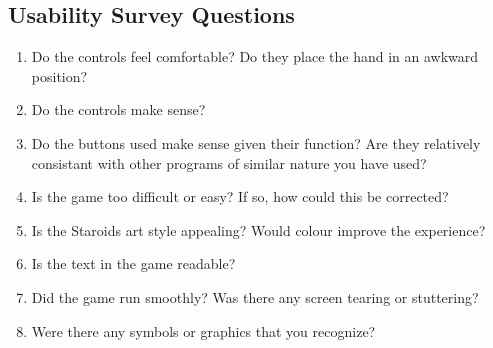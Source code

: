 \documentclass[12pt, titlepage]{article}
\begin{document}
\subsection{Usability Survey Questions}
\label{interview:questions}

\begin{enumerate}

  \item Do the controls feel comfortable? Do they place the hand in an awkward position?
  \item Do the controls make sense?
  \item Do the buttons used make sense given their function? Are they relatively consistant with other programs of similar nature you have used?
  \item Is the game too difficult or easy? If so, how could this be corrected?
  \item Is the Staroids art style appealing? Would colour improve the experience?
  \item Is the text in the game readable?
  \item Did the game run smoothly? Was there any screen tearing or stuttering?
  \item Were there any symbols or graphics that you recognize?

\end{enumerate}
\end{document}
